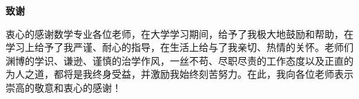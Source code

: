 
\begin{center}
\bf{} 致\hspace{2em}谢
\end{center}

衷心的感谢数学专业各位老师，在大学学习期间，给予了我极大地鼓励和帮助，在学习上给予了我严谨、耐心的指导，在生活上给与了我亲切、热情的关怀。老师们渊博的学识、谦逊、谨慎的治学作风，一丝不苟、尽职尽责的工作态度以及正直的为人之道，都将是我终身受益，并激励我始终刻苦努力。在此，我向各位老师表示崇高的敬意和衷心的感谢！

